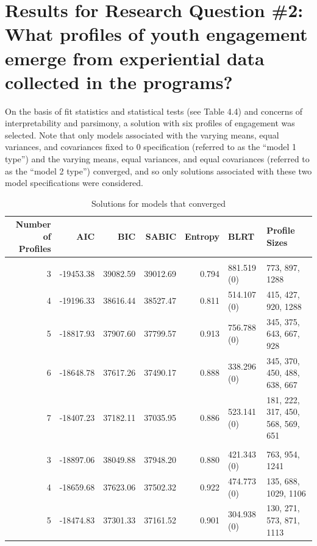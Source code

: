 \documentclass[]{book}
\theoremstyle{definition}
\theoremstyle{definition}
\theoremstyle{definition}
\theoremstyle{remark}
\begin{document}
\section{Results for Research Question \#2: What profiles of youth
engagement emerge from experiential data collected in the
programs?}\label{results-for-research-question-2-what-profiles-of-youth-engagement-emerge-from-experiential-data-collected-in-the-programs}

On the basis of fit statistics and statistical tests (see Table 4.4) and
concerns of interpretability and parsimony, a solution with six profiles
of engagement was selected. Note that only models associated with the
varying means, equal variances, and covariances fixed to 0 specification
(referred to as the ``model 1 type'') and the varying means, equal
variances, and equal covariances (referred to as the ``model 2 type'')
converged, and so only solutions associated with these two model
specifications were considered.

\begin{landscape}\begin{table}

\caption{\label{tab:unnamed-chunk-10}Solutions for models that converged}
\centering
\begin{tabular}[t]{rrrrrll}
\toprule
Number of Profiles & AIC & BIC & SABIC & Entropy & BLRT & Profile Sizes\\
\midrule
\addlinespace[0.3em]
\multicolumn{7}{l}{\textbf{Model 1}}\\
\hspace{1em}3 & -19453.38 & 39082.59 & 39012.69 & 0.794 & 881.519 (0) & 773, 897, 1288\\
\hspace{1em}4 & -19196.33 & 38616.44 & 38527.47 & 0.811 & 514.107 (0) & 415, 427, 920, 1288\\
\hspace{1em}5 & -18817.93 & 37907.60 & 37799.57 & 0.913 & 756.788 (0) & 345, 375, 643, 667, 928\\
\hspace{1em}6 & -18648.78 & 37617.26 & 37490.17 & 0.888 & 338.296 (0) & 345, 370, 450, 488, 638, 667\\
\hspace{1em}7 & -18407.23 & 37182.11 & 37035.95 & 0.886 & 523.141 (0) & 181, 222, 317, 450, 568, 569, 651\\
\addlinespace[0.3em]
\multicolumn{7}{l}{\textbf{Model 2}}\\
\hspace{1em}3 & -18897.06 & 38049.88 & 37948.20 & 0.880 & 421.343 (0) & 763, 954, 1241\\
\hspace{1em}4 & -18659.68 & 37623.06 & 37502.32 & 0.922 & 474.773 (0) & 135, 688, 1029, 1106\\
\hspace{1em}5 & -18474.83 & 37301.33 & 37161.52 & 0.901 & 304.938 (0) & 130, 271, 573, 871, 1113\\
\bottomrule
\end{tabular}
\end{table}
\end{landscape}
\end{document}
